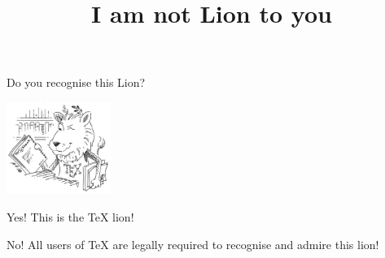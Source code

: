 \documentclass{webquiz}
\title{I am not Lion to you}
\begin{document}
\begin{question}
  Do you recognise this Lion?
  \begin{center}
      \includegraphics[height=30mm]{ctanLion}
  \end{center}

  \begin{choice}
    \correct Yes!
    \response This is the \TeX{} lion!

    \incorrect No!
    \response All users of \TeX{} are legally required to recognise and
    admire this lion!
  \end{choice}
\end{question}
\end{document}
